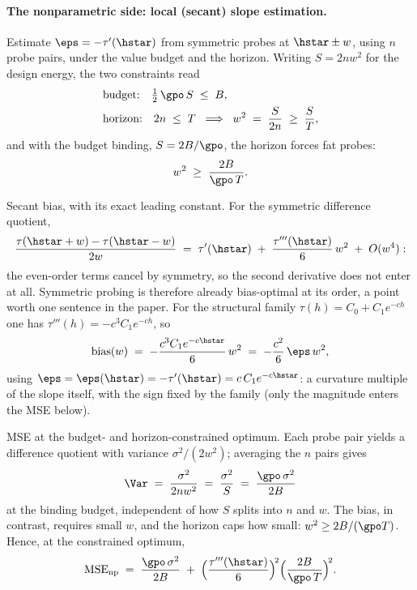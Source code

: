 \paragraph{The nonparametric side: local (secant) slope estimation.}
Estimate $\eps = -\tau'(\hstar)$ from symmetric probes at $\hstar \pm w$,
using $n$ probe pairs, under the value budget and the horizon. Writing
$S = 2 n w^2$ for the design energy, the two constraints read
\begin{equation*}
\begin{aligned}
  &\text{budget:} \quad \tfrac{1}{2}\,\gpo\,S \;\le\; B, \\
  &\text{horizon:} \quad 2n \;\le\; T
  \;\;\Longrightarrow\;\;
  w^2 \;=\; \frac{S}{2n} \;\ge\; \frac{S}{T},
\end{aligned}
\end{equation*}
and with the budget binding, $S = 2B/\gpo$, the horizon forces fat probes:
\begin{equation*}
  w^2 \;\ge\; \frac{2B}{\gpo\,T}.
\end{equation*}

Secant bias, with its exact leading constant. For the symmetric difference
quotient,
\begin{equation*}
  \frac{\tau(\hstar+w) - \tau(\hstar-w)}{2w}
  \;=\; \tau'(\hstar) \;+\; \frac{\tau'''(\hstar)}{6}\,w^2 \;+\; O(w^4):
\end{equation*}
the even-order terms cancel by symmetry, so the second derivative does not
enter at all. Symmetric probing is therefore already bias-optimal at its
order, a point worth one sentence in the paper. For the structural family
$\tau(h) = C_0 + C_1 e^{-ch}$ one has $\tau'''(h) = -c^3 C_1 e^{-ch}$, so
\begin{equation*}
  \mathrm{bias}(w)
  \;=\; -\frac{c^3 C_1 e^{-c\hstar}}{6}\,w^2
  \;=\; -\frac{c^2}{6}\,\eps\,w^2,
\end{equation*}
using $\eps = \eps(\hstar) = -\tau'(\hstar) = c\,C_1 e^{-c\hstar}$: a
curvature multiple of the slope itself, with the sign fixed by the family
(only the magnitude enters the MSE below).

MSE at the budget- and horizon-constrained optimum. Each probe pair yields
a difference quotient with variance $\sigma^2/(2w^2)$; averaging the $n$
pairs gives
\begin{equation*}
  \Var \;=\; \frac{\sigma^2}{2 n w^2} \;=\; \frac{\sigma^2}{S}
  \;=\; \frac{\gpo\,\sigma^2}{2B}
\end{equation*}
at the binding budget, independent of how $S$ splits into $n$ and $w$. The
bias, in contrast, requires small $w$, and the horizon caps how small:
$w^2 \ge 2B/(\gpo T)$. Hence, at the constrained optimum,
\begin{equation*}
  \mathrm{MSE}_{\mathrm{np}}
  \;=\; \frac{\gpo\,\sigma^2}{2B}
  \;+\; \Big(\frac{\tau'''(\hstar)}{6}\Big)^{\!2}
        \Big(\frac{2B}{\gpo\,T}\Big)^{\!2}.
\end{equation*}


